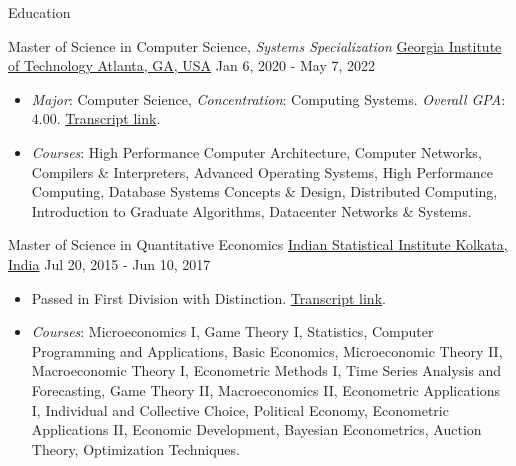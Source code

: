 \documentclass[]{mcdowellcv}
\begin{document}
  \begin{cvsection}{Education}
    \begin{cvsubsection}
      {Master of Science in Computer Science, \textit{Systems Specialization}}
      {\href{https://www.gatech.edu/}{Georgia Institute of Technology \linebreak Atlanta, GA, USA}}
      {Jan 6, 2020 - May 7, 2022}
      \begin{itemize}
        \item
          \textit{Major}: Computer Science, \textit{Concentration}: Computing
          Systems. \textit{Overall GPA}: 4.00.
          \href{https://drive.google.com/file/d/1rG1vO2I3fK_aVtkboU8p6I_6vYUQBlf9/view?usp=sharing}{Transcript
          link}.
        \item
          \textit{Courses}: High Performance Computer Architecture, Computer
          Networks, Compilers \& Interpreters, Advanced Operating Systems, High
          Performance Computing, Database Systems Concepts \& Design,
          Distributed Computing, Introduction to Graduate Algorithms,
          Datacenter Networks \& Systems.
      \end{itemize}
    \end{cvsubsection}
    \begin{cvsubsection}
      {Master of Science in Quantitative Economics}
      {\href{https://www.isical.ac.in/}{Indian Statistical Institute \linebreak Kolkata, India}}
      {Jul 20, 2015 - Jun 10, 2017}
      \begin{itemize}
        \item
          Passed in First Division with Distinction.
          \href{https://drive.google.com/file/d/1b0q9SZj-vi8_KwSI1X1aQ1qtAroeXgw0/view?usp=sharing}{Transcript
          link}.
        \item
          \textit{Courses}: Microeconomics I, Game Theory I, Statistics,
          Computer Programming and Applications, Basic Economics, Microeconomic
          Theory II, Macroeconomic Theory I, Econometric Methods I, Time Series
          Analysis and Forecasting, Game Theory II, Macroeconomics II,
          Econometric Applications I, Individual and Collective Choice,
          Political Economy, Econometric Applications II, Economic Development,
          Bayesian Econometrics, Auction Theory, Optimization Techniques.
      \end{itemize}
    \end{cvsubsection}
    \begin{cvsubsection}

\end{cvsubsection}
\end{cvsection}
\end{document}
